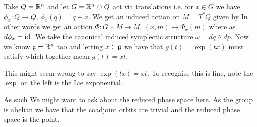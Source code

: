 \documentclass{article}
\begin{document}
\begin{example}
Take $Q = \mathbb{R}^n$ and let $G = \mathbb{R}^n \circlearrowright Q$ act via translations i.e. for $x \in G$ we have $\phi_x:Q \to Q, \, \phi_x(q) = q+x$. We get an induced action on $M = T^\ast Q$ given by 
In other words we get an action $\Phi : G \times M \to M, \, (x,m) \mapsto \Phi_x(m)$ where 
as $d\phi_x = \operatorname{id}$. We take the canonical induced symplectic structure $\omega = dq \wedge dp$. Now we know $\mathfrak{g} = \mathbb{R}^n$ too and letting $x \in \mathfrak{g}$ we have that $g(t) = \exp(tx)$ must satisfy 
which together mean $g(t) = xt$. 
\begin{remark}
	This might seem wrong to say $\exp(tx) = xt$. To recognise this is fine, note the $\exp$ on the left is the Lie exponential. 
\end{remark}
As such 
We might want to ask about the reduced phase space here. As the group is abelian we have that the coadjoint orbits are trivial and the reduced phase space is 
the point.
\end{example}
\end{document}
